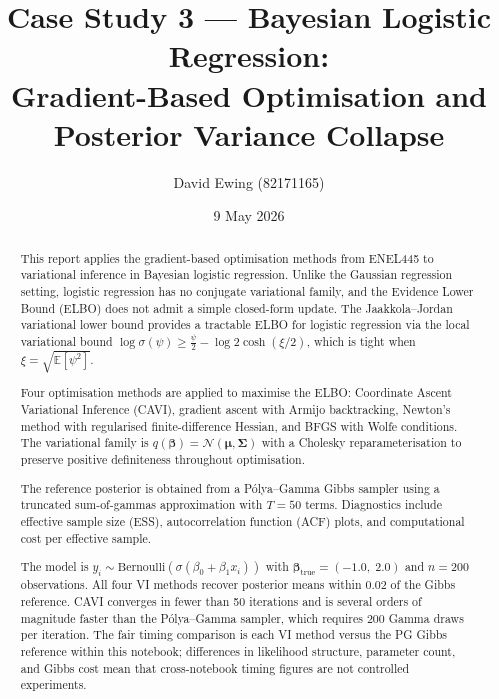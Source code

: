 \documentclass[11pt,a4paper]{article}
\title{
Case Study 3 --- Bayesian Logistic Regression:\\[0.4em]
Gradient-Based Optimisation and Posterior Variance Collapse
}
\author{
  David Ewing (82171165)
}
\date{9 May 2026}
\newcommand{\E}{\mathbb{E}}
\newcommand{\N}{\mathcal{N}}
\begin{document}
\maketitle

\begin{abstract}
\setlength{\parindent}{0pt}
\setlength{\parskip}{0.7em}

This report applies the gradient-based optimisation methods from ENEL445 to variational
inference in Bayesian logistic regression.
Unlike the Gaussian regression setting, logistic regression has no conjugate variational
family, and the Evidence Lower Bound (ELBO) does not admit a simple closed-form update.
The Jaakkola--Jordan \parencite{Jaakkola2000} variational lower bound provides a tractable
ELBO for logistic regression via the local variational bound $\log\sigma(\psi) \geq
\tfrac{\psi}{2} - \log 2\cosh(\xi/2)$, which is tight when $\xi = \sqrt{\E[\psi^2]}$.

Four optimisation methods are applied to maximise the ELBO:
Coordinate Ascent Variational Inference (CAVI), gradient ascent with Armijo backtracking,
Newton's method with regularised finite-difference Hessian, and BFGS with Wolfe conditions.
The variational family is $q(\bm{\beta}) = \N(\bm{\mu},\bm{\Sigma})$ with a
Cholesky reparameterisation to preserve positive definiteness throughout optimisation.

The reference posterior is obtained from a P\'{o}lya--Gamma Gibbs sampler
\parencite{Polson2013} using a truncated sum-of-gammas approximation with $T=50$ terms.
Diagnostics include effective sample size (ESS), autocorrelation function (ACF) plots,
and computational cost per effective sample.

The model is $y_i \sim \mathrm{Bernoulli}(\sigma(\beta_0 + \beta_1 x_i))$
with $\bm{\beta}_{\mathrm{true}} = (-1.0,\; 2.0)$ and $n=200$ observations.
All four VI methods recover posterior means within $0.02$ of the Gibbs reference.
CAVI converges in fewer than 50 iterations and is several orders of magnitude faster
than the P\'{o}lya--Gamma sampler, which requires $200$ Gamma draws per iteration.
The fair timing comparison is each VI method versus the PG Gibbs reference within
this notebook; differences in likelihood structure, parameter count, and Gibbs cost
mean that cross-notebook timing figures are not controlled experiments.
\end{abstract}

\newpage

\end{document}
